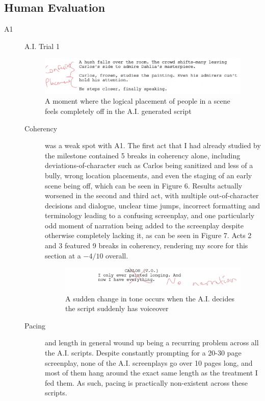 \documentclass[sigconf]{acmart}
\begin{document}
\subsection{Human Evaluation}
\begin{description}
    \item[A1] A.I. Trial 1
    \begin{figure}[!hbt]
            \centering
            \includegraphics[width=0.8\linewidth]{images/ConfusingPlacement.png}
            \caption{A moment where the logical placement of people in a scene feels completely off in the A.I. generated script}
            \label{fig:a1-confusing}
        \end{figure}
    \begin{description}
        \item[Coherency] was a weak spot with A1. The first act that I had already studied by the milestone contained 5 breaks in coherency alone, including deviations-of-character such as Carlos being sanitized and less of a bully, wrong location placements, and even the staging of an early scene being off, which can be seen in Figure 6.
        Results actually worsened in the second and third act, with multiple out-of-character decisions and dialogue, unclear time jumps, incorrect formatting and terminology leading to a confusing screenplay, and one particularly odd moment of narration being added to the screenplay despite otherwise completely lacking it, as can be seen in Figure 7. Acts 2 and 3 featured 9 breaks in coherency, rendering my score for this section at a $-4/10$ overall.
        \begin{figure}[!hbt]
            \centering
            \includegraphics[width=0.8\linewidth]{images/Narration.png}
            \caption{A sudden change in tone occurs when the A.I. decides the script suddenly has voiceover}
            \label{fig:a1-narrator}
        \end{figure}
        \item[Pacing] and length in general wound up being a recurring problem across all the A.I. scripts. Despite constantly prompting for a 20-30 page screenplay, none of the A.I. screenplays go over 10 pages long, and most of them hang around the exact same length as the treatment I fed them. As such, pacing is practically non-existent across these scripts.\\

\end{description}
\end{description}
\end{document}
